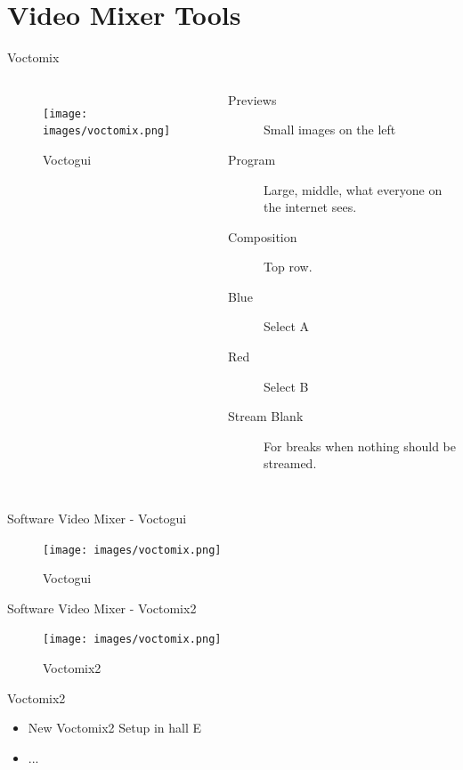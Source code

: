 \documentclass[aspectratio=169]{beamer}
\begin{document}
\section{Video Mixer Tools}

\begin{frame}{Voctomix}
	\begin{columns}[T,onlytextwidth]
	\begin{figure} 
		\centering
		\texttt{[image: images/voctomix.png]}
		\caption{Voctogui}
		\label{fig:voctogui1}
	\end{figure}

	\begin{description}
		\item[Previews] Small images on the left 
		\item[Program] Large, middle, what everyone on the internet sees.
		\item[Composition] Top row.
		\item[Blue] Select A
		\item[Red] Select B
		\item[Stream Blank] For breaks when nothing should be streamed.
     \end{description}
	\end{columns}
\end{frame}

\begin{frame}{Software Video Mixer - Voctogui}
	\begin{figure} 
		\centering
		\texttt{[image: images/voctomix.png]}
		\caption{Voctogui}
	\end{figure}
\end{frame}

\begin{frame}{Software Video Mixer - Voctomix2}%
	\begin{figure} 
		\centering
		\texttt{[image: images/voctomix.png]}%
		\caption{Voctomix2}
	\end{figure}
\end{frame}

\begin{frame}{Voctomix2}%
\begin{itemize}
	\item New Voctomix2 Setup in hall E
	\item ...
\end{itemize}
\end{frame}
\end{document}
